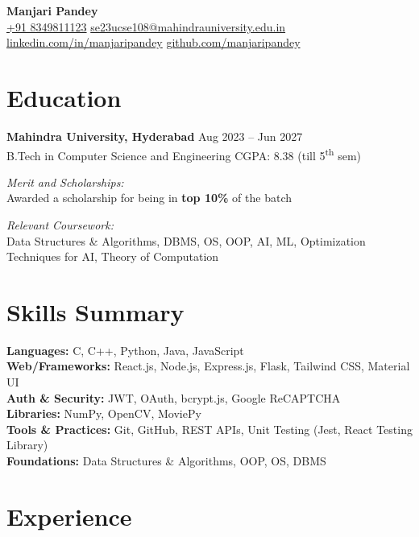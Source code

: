 \documentclass[a4paper,11pt]{article}
\begin{document}
\begin{center}
    {\huge \textbf{Manjari Pandey}} \\[4pt]
    \href{tel:+918349811123}{+91 8349811123} \quad
    \href{mailto:se23ucse108@mahindrauniversity.edu.in}{se23ucse108@mahindrauniversity.edu.in} \quad
    \href{https://www.linkedin.com/in/manjari-pandey-a95ba92a8/}{linkedin.com/in/manjaripandey} \quad
    \href{https://github.com/manjaripandey}{github.com/manjaripandey}
\end{center}

\section*{Education}
\textbf{Mahindra University, Hyderabad} \hfill Aug 2023 – Jun 2027 \\
B.Tech in Computer Science and Engineering \hfill CGPA: 8.38 (till 5\textsuperscript{th} sem)

\textit{Merit and Scholarships:} \\
Awarded a scholarship for being in \textbf{top 10\%} of the batch

\textit{Relevant Coursework:} \\
Data Structures \& Algorithms, DBMS, OS, OOP, AI, ML, Optimization Techniques for AI, Theory of Computation

\section*{Skills Summary}
\textbf{Languages:} C, C++, Python, Java, JavaScript \\
\textbf{Web/Frameworks:} React.js, Node.js, Express.js, Flask, Tailwind CSS, Material UI \\
\textbf{Auth \& Security:} JWT, OAuth, bcrypt.js, Google ReCAPTCHA \\
\textbf{Libraries:} NumPy, OpenCV, MoviePy \\
\textbf{Tools \& Practices:} Git, GitHub, REST APIs, Unit Testing (Jest, React Testing Library) \\
\textbf{Foundations:} Data Structures \& Algorithms, OOP, OS, DBMS

\section*{Experience}
\end{document}
